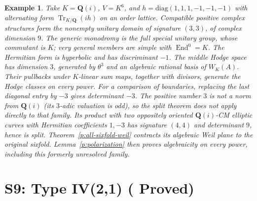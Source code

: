 \documentclass[11pt,reqno]{article}
\theoremstyle{emphasizedplain}
\DeclareRobustCommand{\provedstatus}{%
  \texorpdfstring{\textcolor{ProvedGreen}{\textbf{Proved}}}{Proved}}
\theoremstyle{emphasizeddefinition}
\newtheorem{example}[theorem]{Example}
\theoremstyle{emphasizeddefinition}
\DeclareMathOperator{\End}{End}
\DeclareMathOperator{\Tr}{Tr}
\newcommand{\Q}{\mathbf Q}
\begin{document}
\begin{example}
Take $K=\Q(i)$, $V=K^6$, and
$h=\mathrm{diag}(1,1,1,-1,-1,-1)$ with alternating form
$\Tr_{K/\Q}(i h)$ on an order lattice. Compatible positive complex
structures form the nonempty unitary domain of signature $(3,3)$, of
complex dimension $9$. The generic monodromy is the full special unitary
group, whose commutant is $K$; very general members are simple with
$\End^0=K$. The Hermitian form is hyperbolic and has discriminant $-1$.
The middle Hodge space has dimension $3$, generated by $\theta^3$ and an
algebraic rational basis of $W_K(A)$. Their pullbacks under $K$-linear sum
maps, together with divisors, generate the Hodge classes on every power.
For a comparison of boundaries, replacing the last diagonal entry by
$-3$ gives determinant $-3$. The positive number $3$ is not a norm from
$\Q(i)$ (its $3$-adic valuation is odd), so the split theorem does not
apply directly to that family. Its product with two oppositely oriented
$\Q(i)$-CM elliptic curves with Hermitian coefficients $1,-3$
has signature $(4,4)$ and determinant $9$, hence is split.
Theorem~\ref{p:all-sixfold-weil} contracts its algebraic Weil plane
to the original sixfold. Lemma~\ref{p:polarization} then proves
algebraicity on every power, including this formerly unresolved family.
\end{example}
\section{S9: Type IV(2,1) (\provedstatus)}\label{sec:S9}
\end{document}
